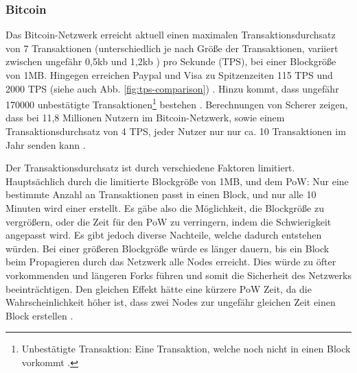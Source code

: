 \subsubsection{Bitcoin}
Das Bitcoin-Netzwerk erreicht aktuell einen maximalen Transaktionsdurchsatz von 7 Transaktionen (unterschiedlich je nach Größe der Transaktionen, variiert zwischen ungefähr 0,5kb und 1,2kb \cite{Bitcoin.comTeamBitcoinTransactionSize}) pro Sekunde (TPS), bei einer Blockgröße von 1MB. Hingegen erreichen Paypal und Visa zu Spitzenzeiten 115 TPS und 2000 TPS (siehe auch Abb. \ref{fig:tps-comparison}) \cite{BitcoinTeamScalabilityBitcoinWiki}. Hinzu kommt, dass ungefähr 170000 unbestätigte Transaktionen\footnote{Unbestätigte Transaktion: Eine Transaktion, welche noch nicht in einen Block vorkommt \cite{AntonopoulosMasteringbitcoin2015}.} bestehen \cite{BlockchainUnternehmenUnbestatigteTransaktionenBitcoin}. Berechnungen von Scherer zeigen, dass bei 11,8 Millionen Nutzern im Bitcoin-Netzwerk, sowie einem Transaktionsdurchsatz von 4 TPS, jeder Nutzer nur nur ca. 10 Transaktionen im Jahr senden kann \cite{SchererPerformanceScalabilityBlockchain2017}.

Der Transaktionsdurchsatz ist durch verschiedene Faktoren limitiert. Hauptsächlich durch die limitierte Blockgröße von 1MB, und dem \acs{PoW}: Nur eine bestimmte Anzahl an Transaktionen passt in einen Block, und nur alle 10 Minuten wird einer erstellt. Es gäbe also die Möglichkeit, die Blockgröße zu vergrößern, oder die Zeit für den \acs{PoW} zu verringern, indem die Schwierigkeit angepasst wird. Es gibt jedoch diverse Nachteile, welche dadurch entstehen würden. Bei einer größeren Blockgröße würde es länger dauern, bis ein Block beim Propagieren durch das Netzwerk alle Nodes erreicht. Dies würde zu öfter vorkommenden und längeren Forks führen und somit die Sicherheit des Netzwerks beeinträchtigen. Den gleichen Effekt hätte eine kürzere \acs{PoW} Zeit, da die Wahrscheinlichkeit höher ist, dass zwei Nodes zur ungefähr gleichen Zeit einen Block erstellen \cite{SchererPerformanceScalabilityBlockchain2017} \cite{EthereumTeamEthereumWhitePaper2017} \cite{SompolinskyAcceleratingBitcoinTransaction2013}. 

